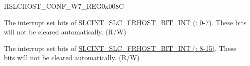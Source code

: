 \begin{register}{H}{SLCHOST\_CONF\_W7\_REG}{0x008C}\label{regdesc:SLCHOSTCONFW7REG}
%
%
%
%
\regnewline%
\begin{regdesc}\begin{reglist}
\label{fielddesc:SLCHOSTSLCHOSTCONF29}\item [SLCHOST\_SLCHOST\_CONF29] The interrupt set bits of \hyperref[int:SLCFRHOSTBITnINT]{SLCINT\_SLC\_FRHOST\_BIT\_INT (: 0-7)}. These bits will not be cleared automatically. (R/W)
\label{fielddesc:SLCHOSTSLCHOSTCONF31}\item [SLCHOST\_SLCHOST\_CONF31] The interrupt set bits of \hyperref[int:SLCFRHOSTBITnINT]{SLCINT\_SLC\_FRHOST\_BIT\_INT (: 8-15)}. These bits will not be cleared automatically. (R/W)
\end{reglist}\end{regdesc}
\end{register}


